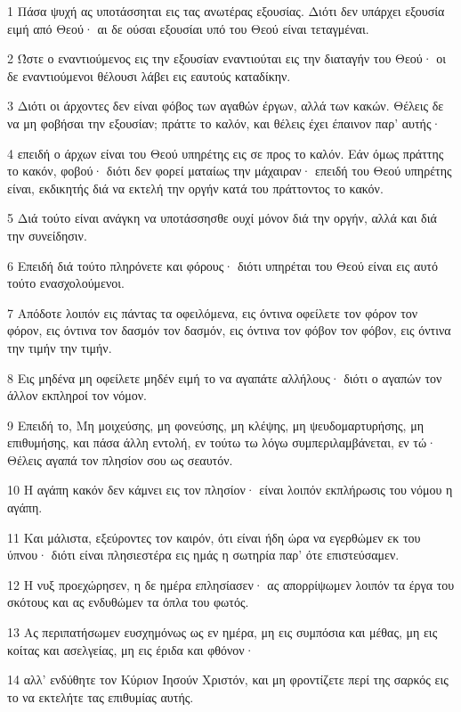 \par 1 Πάσα ψυχή ας υποτάσσηται εις τας ανωτέρας εξουσίας. Διότι δεν υπάρχει εξουσία ειμή από Θεού· αι δε ούσαι εξουσίαι υπό του Θεού είναι τεταγμέναι.
\par 2 Ώστε ο εναντιούμενος εις την εξουσίαν εναντιούται εις την διαταγήν του Θεού· οι δε εναντιούμενοι θέλουσι λάβει εις εαυτούς καταδίκην.
\par 3 Διότι οι άρχοντες δεν είναι φόβος των αγαθών έργων, αλλά των κακών. Θέλεις δε να μη φοβήσαι την εξουσίαν; πράττε το καλόν, και θέλεις έχει έπαινον παρ' αυτής·
\par 4 επειδή ο άρχων είναι του Θεού υπηρέτης εις σε προς το καλόν. Εάν όμως πράττης το κακόν, φοβού· διότι δεν φορεί ματαίως την μάχαιραν· επειδή του Θεού υπηρέτης είναι, εκδικητής διά να εκτελή την οργήν κατά του πράττοντος το κακόν.
\par 5 Διά τούτο είναι ανάγκη να υποτάσσησθε ουχί μόνον διά την οργήν, αλλά και διά την συνείδησιν.
\par 6 Επειδή διά τούτο πληρόνετε και φόρους· διότι υπηρέται του Θεού είναι εις αυτό τούτο ενασχολούμενοι.
\par 7 Απόδοτε λοιπόν εις πάντας τα οφειλόμενα, εις όντινα οφείλετε τον φόρον τον φόρον, εις όντινα τον δασμόν τον δασμόν, εις όντινα τον φόβον τον φόβον, εις όντινα την τιμήν την τιμήν.
\par 8 Εις μηδένα μη οφείλετε μηδέν ειμή το να αγαπάτε αλλήλους· διότι ο αγαπών τον άλλον εκπληροί τον νόμον.
\par 9 Επειδή το, Μη μοιχεύσης, μη φονεύσης, μη κλέψης, μη ψευδομαρτυρήσης, μη επιθυμήσης, και πάσα άλλη εντολή, εν τούτω τω λόγω συμπεριλαμβάνεται, εν τώ· Θέλεις αγαπά τον πλησίον σου ως σεαυτόν.
\par 10 Η αγάπη κακόν δεν κάμνει εις τον πλησίον· είναι λοιπόν εκπλήρωσις του νόμου η αγάπη.
\par 11 Και μάλιστα, εξεύροντες τον καιρόν, ότι είναι ήδη ώρα να εγερθώμεν εκ του ύπνου· διότι είναι πλησιεστέρα εις ημάς η σωτηρία παρ' ότε επιστεύσαμεν.
\par 12 Η νυξ προεχώρησεν, η δε ημέρα επλησίασεν· ας απορρίψωμεν λοιπόν τα έργα του σκότους και ας ενδυθώμεν τα όπλα του φωτός.
\par 13 Ας περιπατήσωμεν ευσχημόνως ως εν ημέρα, μη εις συμπόσια και μέθας, μη εις κοίτας και ασελγείας, μη εις έριδα και φθόνον·
\par 14 αλλ' ενδύθητε τον Κύριον Ιησούν Χριστόν, και μη φροντίζετε περί της σαρκός εις το να εκτελήτε τας επιθυμίας αυτής.

